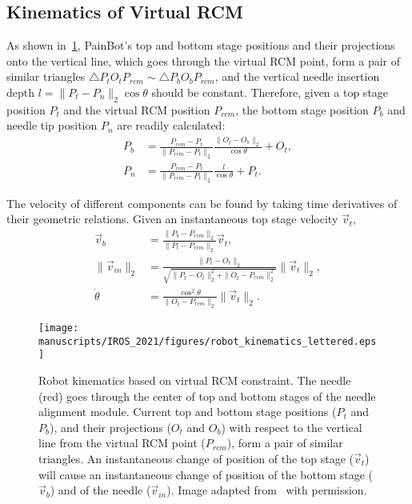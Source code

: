 \subsection{Kinematics of Virtual RCM}
\label{sec:chap-2-kinematics}

As shown in~\cref{fig:robot_kinematics}, PainBot's top and bottom stage positions and their projections onto the vertical line, which goes through the virtual RCM point, form a pair of similar triangles $\triangle P_{t}O_{t}P_{rcm} \sim \triangle P_{b}O_{b}P_{rcm}$, and the vertical needle insertion depth $l = \| P_t - P_n \|_2 \cos{\theta}$ should be constant. Therefore, given a top stage position $P_t$ and the virtual RCM position $P_{rcm}$, the bottom stage position $P_b$ and needle tip position $P_n$ are readily calculated:
\begin{align}
  P_b & = \frac{P_{rcm} - P_{t}}{\| P_{rcm} - P_t \|_2} \frac{\| O_t - O_b \|_2}{\cos{\theta}} + O_t, \\
  P_n & = \frac{P_{rcm} - P_{t}}{\| P_{rcm} - P_t \|_2} \frac{l}{\cos{\theta}} + P_t.
\end{align}

The velocity of different components can be found by taking time derivatives of their geometric relations. Given an instantaneous top stage velocity $\vec{v}_t$,
\begin{align}
  \vec{v}_b &= \frac{\|P_b - P_{rcm}\|_2}{\|P_t - P_{rcm}\|_2} \vec{v}_t,\\
  \|\vec{v}_{in}\|_2 &= \frac{\|P_t - O_t\|_2}{\sqrt{\|P_t - O_t\|_2^2 + \|O_t - P_{rcm}\|_2^2}} \|\vec{v}_t\|_2,\\
  \dot\theta &= \frac{\cos^2{\theta}}{\|O_t - P_{rcm}\|_2} \|\vec{v}_t\|_2.
\end{align}



\begin{figure}[t]
  \centering
  \texttt{[image: manuscripts/IROS\_2021/figures/robot\_kinematics\_lettered.eps]}
  \caption{Robot kinematics based on virtual RCM constraint. The needle (red) goes through the center of top and bottom stages of the needle alignment module. Current top and bottom stage positions ($P_{t}$ and $P_{b}$), and their projections ($O_{t}$ and $O_{b}$) with respect to the vertical line from the virtual RCM point ($P_{rcm}$), form a pair of similar triangles. An instantaneous change of position of the top stage ($\vec{v}_{t}$) will cause an instantaneous change of position of the bottom stage ($\vec{v}_{b}$) and of the needle ($\vec{v}_{in}$). Image adapted from~\parencite{liFullyActuatedBodyMounted2020a} with permission.}
  \label{fig:robot_kinematics}
\end{figure}

